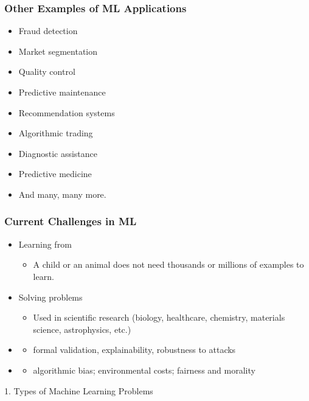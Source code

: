 \begin{frame}
  \frametitle{Other Examples of ML Applications}
  \begin{itemize}
  \item Fraud detection
  \item Market segmentation
  \item Quality control
  \item Predictive maintenance
  \item Recommendation systems
  \item Algorithmic trading
  \item Diagnostic assistance
  \item Predictive medicine
  \item And many, many more.
  \end{itemize}
\end{frame}

\begin{frame}
  \frametitle{Current Challenges in ML}
  \begin{itemize}
  \item Learning from 
    \begin{itemize}
    \item[] A child or an animal does not need thousands or millions
      of examples to learn.
    \end{itemize}
  \item Solving problems 
    \begin{itemize}
    \item[] Used in scientific research (biology, healthcare,
      chemistry, materials science, astrophysics, etc.)
    \end{itemize}
  \item {}
    \begin{itemize}
    \item[] formal validation, explainability, robustness to attacks
    \end{itemize}
  \item {}
    \begin{itemize}
    \item[] algorithmic bias; environmental costs; fairness and morality
    \end{itemize}
  \end{itemize}
\end{frame}

\begin{frame}
  \begin{center}
    \large{1. Types of Machine Learning Problems}
  \end{center}
\end{frame}


